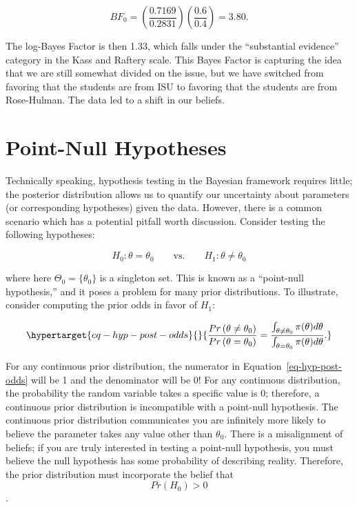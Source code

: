 \documentclass[
  letterpaper,
  DIV=11,
  numbers=noendperiod]{scrreprt}
\theoremstyle{definition}
\theoremstyle{definition}
\theoremstyle{plain}
\theoremstyle{remark}
\begin{document}
\[BF_{0} = \left(\frac{0.7169}{0.2831}\right)\left(\frac{0.6}{0.4}\right) = 3.80.\]

The log-Bayes Factor is then 1.33, which falls under the ``substantial
evidence'' category in the Kass and Raftery scale. This Bayes Factor is
capturing the idea that we are still somewhat divided on the issue, but
we have switched from favoring that the students are from ISU to
favoring that the students are from Rose-Hulman. The data led to a shift
in our beliefs.

\hypertarget{point-null-hypotheses}{%
\section{Point-Null Hypotheses}\label{point-null-hypotheses}}

Technically speaking, hypothesis testing in the Bayesian framework
requires little; the posterior distribution allows us to quantify our
uncertainty about parameters (or corresponding hypotheses) given the
data. However, there is a common scenario which has a potential pitfall
worth discussion. Consider testing the following hypotheses:

\[H_0: \theta = \theta_0 \qquad \text{vs.} \qquad H_1: \theta \neq \theta_0\]

where here \(\Theta_0 = \{\theta_0\}\) is a singleton set. This is known
as a ``point-null hypothesis,'' and it poses a problem for many prior
distributions. To illustrate, consider computing the prior odds in favor
of \(H_1\):

\begin{equation}\protect\hypertarget{eq-hyp-post-odds}{}{\frac{Pr\left(\theta \neq \theta_0\right)}{Pr\left(\theta = \theta_0\right)} = \frac{\int_{\theta \neq \theta_0}^{} \pi(\theta) d\theta}{\int_{\theta = \theta_0}^{} \pi(\theta) d\theta}.}\label{eq-hyp-post-odds}\end{equation}

For any continuous prior distribution, the numerator in
Equation~\ref{eq-hyp-post-odds} will be 1 and the denominator will be 0!
For any continuous distribution, the probability the random variable
takes a specific value is 0; therefore, a continuous prior distribution
is incompatible with a point-null hypothesis. The continuous prior
distribution communicates you are infinitely more likely to believe the
parameter takes any value other than \(\theta_0\). There is a
misalignment of beliefs; if you are truly interested in testing a
point-null hypothesis, you must believe the null hypothesis has some
probability of describing reality. Therefore, the prior distribution
must incorporate the belief that \[Pr\left(H_0\right) > 0\].
\end{document}
